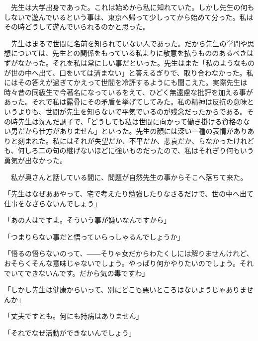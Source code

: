 \documentclass[a4j,onecolumn]{tarticle}
\begin{document}
　先生は大学出身であった。\hbox{}これは始めから私に知れていた。\hbox{}しかし先生の何もしないで遊んでいるという事は、\hbox{}東京へ帰って少しってから始めて分った。\hbox{}私はその時どうして遊んでいられるのかと思った。\hbox{}\par{}
　先生はまるで世間に名前を知られていない人であった。\hbox{}だから先生の学問や思想については、\hbox{}先生との関係をもっている私よりに敬意を払うもののあるべきはずがなかった。\hbox{}それを私は常にしい事だといった。\hbox{}先生はまた「私のようなものが世の中へ出て、\hbox{}口をいては済まない」と答えるぎりで、\hbox{}取り合わなかった。\hbox{}私にはその答えが過ぎてかえって世間を冷評するようにも聞こえた。\hbox{}実際先生は時々昔の同級生で今著名になっているをえて、\hbox{}ひどく無遠慮な批評を加える事があった。\hbox{}それで私は露骨にその矛盾を挙げてしてみた。\hbox{}私の精神は反抗の意味というよりも、\hbox{}世間が先生を知らないで平気でいるのが残念だったからである。\hbox{}その時先生は沈んだ調子で、\hbox{}「どうしても私は世間に向かって働き掛ける資格のない男だから仕方がありません」といった。\hbox{}先生の顔には深い一種の表情がありありと刻まれた。\hbox{}私にはそれが失望だか、\hbox{}不平だか、\hbox{}悲哀だか、\hbox{}らなかったけれども、\hbox{}何しろ二の句の継げないほどに強いものだったので、\hbox{}私はそれぎり何もいう勇気が出なかった。\hbox{}\par{}
　私が奥さんと話している間に、\hbox{}問題が自然先生の事からそこへ落ちて来た。\hbox{}\par{}
「先生はなぜああやって、\hbox{}宅で考えたり勉強したりなさるだけで、\hbox{}世の中へ出て仕事をなさらないんでしょう」\par{}
「あの人はですよ。\hbox{}そういう事が嫌いなんですから」\par{}
「つまりらない事だと悟っていらっしゃるんでしょうか」\par{}
「悟るの悟らないのって、\hbox{}――そりゃ女だからわたくしには解りませんけれど、\hbox{}おそらくそんな意味じゃないでしょう。\hbox{}やっぱり何かやりたいのでしょう。\hbox{}それでいてできないんです。\hbox{}だから気の毒ですわ」\par{}
「しかし先生は健康からいって、\hbox{}別にどこも悪いところはないようじゃありませんか」\par{}
「丈夫ですとも。\hbox{}何にも持病はありません」\par{}
「それでなぜ活動ができないんでしょう」\par{}
\end{document}
